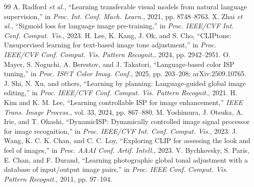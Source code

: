 \documentclass[journal]{IEEEtran}
\begin{document}
\begin{thebibliography}{99}
A. Radford \emph{et al.}, ``Learning transferable visual models from natural language supervision,'' in \emph{Proc. Int. Conf. Mach. Learn.}, 2021, pp. 8748--8763.
X. Zhai \emph{et al.}, ``Sigmoid loss for language image pre-training,'' in \emph{Proc. IEEE/CVF Int. Conf. Comput. Vis.}, 2023.
H. Lee, K. Kang, J. Ok, and S. Cho, ``CLIPtone: Unsupervised learning for text-based image tone adjustment,'' in \emph{Proc. IEEE/CVF Conf. Comput. Vis. Pattern Recognit.}, 2024, pp. 2942--2951.
O. Mayer, S. Noguchi, A. Berestov, and J. Takatori, ``Language-based color ISP tuning,'' in \emph{Proc. IS\&T Color Imag. Conf.}, 2025, pp. 203--208; arXiv:2509.10765.
J. Shi, N. Xu, and others, ``Learning by planning: Language-guided global image editing,'' in \emph{Proc. IEEE/CVF Conf. Comput. Vis. Pattern Recognit.}, 2021.
H. Kim and K. M. Lee, ``Learning controllable ISP for image enhancement,'' \emph{IEEE Trans. Image Process.}, vol. 33, 2024, pp. 867--880.
M. Yoshimura, J. Otsuka, A. Irie, and T. Ohashi, ``DynamicISP: Dynamically controlled image signal processor for image recognition,'' in \emph{Proc. IEEE/CVF Int. Conf. Comput. Vis.}, 2023.
J. Wang, K. C. K. Chan, and C. C. Loy, ``Exploring CLIP for assessing the look and feel of images,'' in \emph{Proc. AAAI Conf. Artif. Intell.}, 2023.
V. Bychkovsky, S. Paris, E. Chan, and F. Durand, ``Learning photographic global tonal adjustment with a database of input/output image pairs,'' in \emph{Proc. IEEE Conf. Comput. Vis. Pattern Recognit.}, 2011, pp. 97--104.
\end{thebibliography}
\end{document}
